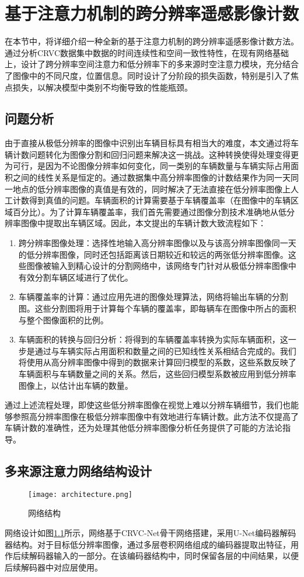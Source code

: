 
\chapter{基于注意力机制的跨分辨率遥感影像计数}
在本节中，将详细介绍一种全新的基于注意力机制的跨分辨率遥感影像计数方法。通过分析CRVC数据集中数据的时间连续性和空间一致性特性，在现有网络基础上，设计了跨分辨率空间注意力和低分辨率下的多来源时空注意力模块，充分结合了图像中的不同尺度，位置信息。同时设计了分阶段的损失函数，特别是引入了焦点损失，以解决模型中类别不均衡导致的性能瓶颈。
\section{问题分析}
由于直接从极低分辨率的图像中识别出车辆目标具有相当大的难度，本文通过将车辆计数问题转化为图像分割和回归问题来解决这一挑战。这种转换使得处理变得更为可行，是因为不论图像分辨率如何变化，同一类别的车辆数量与车辆实际占用面积之间的线性关系是恒定的。通过数据集中高分辨率图像的计数结果作为同一天同一地点的低分辨率图像的真值是有效的，同时解决了无法直接在低分辨率图像上人工计数得到真值的问题。车辆面积的计算需要基于车辆覆盖率（在图像中的车辆区域百分比）。为了计算车辆覆盖率，我们首先需要通过图像分割技术准确地从低分辨率图像中提取出车辆区域。因此，本文提出的车辆计数大致流程如下：
\begin{enumerate}    
\item 跨分辨率图像处理：选择性地输入高分辨率图像以及与该高分辨率图像同一天的低分辨率图像，同时还包括距离该日期较近和较远的两张低分辨率图像。这些图像被输入到精心设计的分割网络中，该网络专门针对从极低分辨率图像中有效分割车辆区域进行了优化。
\item 车辆覆盖率的计算：通过应用先进的图像处理算法，网络将输出车辆的分割图。这些分割图将用于计算每个车辆的覆盖率，即每辆车在图像中所占的面积与整个图像面积的比例。
\item 车辆面积的转换与回归分析：将得到的车辆覆盖率转换为实际车辆面积，这一步是通过与车辆实际占用面积和数量之间的已知线性关系相结合完成的。我们将使用从高分辨率图像中得到的数据来计算回归模型的系数，这些系数反映了车辆面积与车辆数量之间的关系。然后，这些回归模型系数被应用到低分辨率图像上，以估计出车辆的数量。
\end{enumerate}

通过上述流程处理，即使这些低分辨率图像在视觉上难以分辨车辆细节，我们也能够参照高分辨率图像在极低分辨率图像中有效地进行车辆计数。此方法不仅提高了车辆计数的准确性，还为处理其他低分辨率图像分析任务提供了可能的方法论指导。
\section{多来源注意力网络结构设计}
\begin{figure}[h]
    \centering
    \texttt{[image: architecture.png]}
    \caption{网络结构}
    \label{fig:architecture}
  \end{figure}
网络设计如图\ref{fig:architecture}所示，网络基于CRVC-Net骨干网络搭建，采用U-Net编码器解码器结构。对于目标低分辨率图像，通过多层卷积网络组成的编码器提取出特征，用作后续解码器输入的一部分。在该编码器结构中，同时保留各层的中间结果，以便后续解码器中对应层使用。

